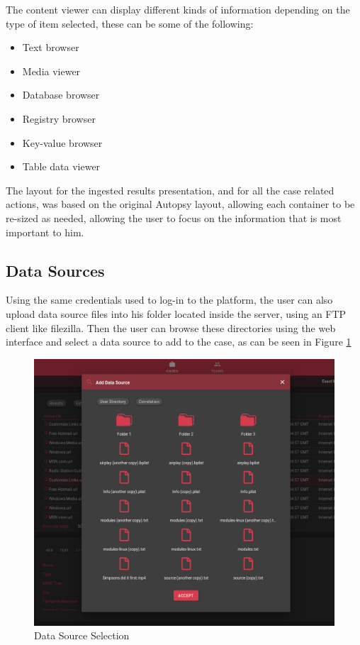The content viewer can display different kinds of information depending on the type of item selected, these can be some of the following:
\begin{itemize}
 \item Text browser
 \item Media viewer
 \item Database browser
 \item Registry browser
 \item Key-value browser
 \item Table data viewer
\end{itemize}

The layout for the ingested results presentation, and for all the case related actions, was based on the original Autopsy layout, allowing each container to be re-sized as
needed, allowing the user to focus on the information that is most important to him.

\subsection{Data Sources}

Using the same credentials used to log-in to the platform, the user can also upload data source files into his folder located inside the server, using an FTP client like filezilla.
Then the user can browse these directories using the web interface and select a data source to add to the case, as can be seen in Figure \ref{fig:datasource}

\begin{figure}[h]
 \centering
 \includegraphics[width=0.85\linewidth]{imgs/data-sources.png}
 \caption{Data Source Selection}
 \label{fig:datasource}
\end{figure}

